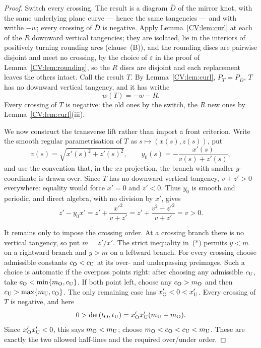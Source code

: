 \begin{proof}
Switch every crossing. The result is a diagram $\overline D$ of the mirror knot,
with the same underlying plane curve --- hence the same tangencies --- and with
writhe $-w$; every crossing of $\overline D$ is negative. Apply
Lemma~\ref{CV:lem:curl} at each of the $R$ downward vertical tangencies; they are
isolated, lie in the interiors of positively turning rounding arcs
(clause~(B)), and the rounding discs are pairwise disjoint and
meet no crossing, by the choice of $\varepsilon$ in the proof of
Lemma~\ref{CV:lem:rounding}, so the $R$ discs are
disjoint and each replacement leaves the others intact. Call the result $T$. By
Lemma~\ref{CV:lem:curl}, $P_T=P_{\overline D}$, $T$ has no downward vertical
tangency, and it has writhe
\[
w(T)=-w-R .
\]
Every crossing of $T$ is negative: the old ones by the switch, the $R$ new ones by
Lemma~\ref{CV:lem:curl}(iii).

We now construct the transverse lift rather than import a
front criterion.  Write the smooth regular parametrisation of $T$ as
$s\mapsto(x(s),z(s))$, put
\[
 v(s)=\sqrt{x'(s)^2+z'(s)^2},\qquad
 y_0(s)=-\frac{x'(s)}{v(s)+z'(s)},
\]
and use the convention that, in the $xz$ projection, the branch with smaller
$y$-coordinate is drawn over.  Since $T$ has no downward vertical tangency,
$v+z'>0$ everywhere: equality would force $x'=0$ and $z'<0$.  Thus $y_0$ is
smooth and periodic, and direct algebra, with no division by $x'$, gives
\[
 z'-y_0x'=z'+\frac{x'^2}{v+z'}
 =z'+\frac{v^2-z'^2}{v+z'}=v>0.                 \tag{*}
\]

It remains only to impose the crossing order.  At a crossing branch there is
no vertical tangency, so put $m=z'/x'$.  The strict inequality in~(*) permits
$y<m$ on a rightward branch and $y>m$ on a leftward branch.  For every crossing
choose admissible constants $c_{\rm O}<c_{\rm U}$ at its over- and underpassing
preimages.  Such a choice is automatic if the overpass points right: after
choosing any admissible $c_{\rm U}$, take
$c_{\rm O}<\min\{m_{\rm O},c_{\rm U}\}$.  If both point left, choose any
$c_{\rm O}>m_{\rm O}$ and then
$c_{\rm U}>\max\{m_{\rm U},c_{\rm O}\}$.  The only remaining case has
$x'_{\rm O}<0<x'_{\rm U}$.  Every crossing of $T$ is negative, and here
\[
 0>\det(t_{\rm O},t_{\rm U})
   =x'_{\rm O}x'_{\rm U}(m_{\rm U}-m_{\rm O}).
\]
Since $x'_{\rm O}x'_{\rm U}<0$, this says $m_{\rm O}<m_{\rm U}$; choose
$m_{\rm O}<c_{\rm O}<c_{\rm U}<m_{\rm U}$.  These are exactly the two allowed
half-lines and the required over/under order.


\end{proof}
